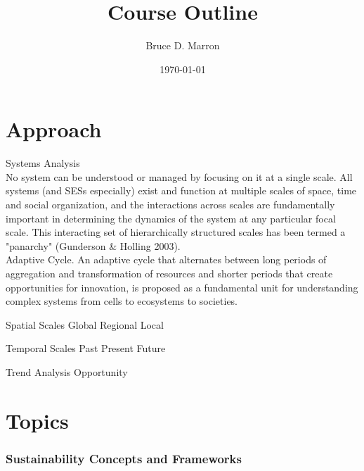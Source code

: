 \documentclass[12pt, letterpaper]{article}
\title{\vspace{-15mm}\fontsize{14pt}{10pt}
                    \selectfont \textbf{Course Outline}   %
                    \vspace{-7mm}
      }
\author{
     \normalsize Bruce D. Marron \\                     %
     \vspace{-5mm}
}
\date{\normalsize \today}
\begin{document}
\begin{singlespacing}
\maketitle                                      %
\end{singlespacing}
\thispagestyle{fancy}                           %

\section{Approach}
\begin{outline}[enumerate]
\1 Systems Analysis\\
No system can be understood or managed by focusing on it at a single scale. All systems (and SESs especially) exist and function at multiple scales of space, time and social organization, and the interactions across scales are fundamentally important in determining the dynamics of the system at any particular focal scale. This interacting set of hierarchically structured scales has been termed a "panarchy" (Gunderson \& Holling 2003). \\
Adaptive Cycle. An adaptive cycle that alternates between long periods of aggregation and transformation of resources and shorter periods that create opportunities for innovation, is proposed as a fundamental unit for understanding complex systems from cells to ecosystems to societies.

\2 Spatial Scales
\3 Global
\3 Regional
\3 Local

\2 Temporal Scales
\3 Past
\3 Present
\3 Future

\2 Trend Analysis
\2 Opportunity
\end{outline}



\section{Topics}
\subsubsection{Sustainability Concepts and Frameworks}
\begin{outline}[enumerate]
\1 

\end{outline}
\end{document}
